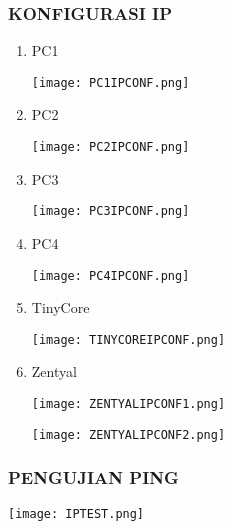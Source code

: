 \documentclass[12pt,a4paper]{article}
\begin{document}
\begin{center}
\subsubsection*{KONFIGURASI IP}
\begin{enumerate}

  \item PC1

    \texttt{[image: PC1IPCONF.png]}

  \item PC2

    \texttt{[image: PC2IPCONF.png]}

  \item PC3

    \texttt{[image: PC3IPCONF.png]}

  \item PC4

    \texttt{[image: PC4IPCONF.png]}

  \item TinyCore

    \texttt{[image: TINYCOREIPCONF.png]}

  \item Zentyal

    \texttt{[image: ZENTYALIPCONF1.png]}

    \texttt{[image: ZENTYALIPCONF2.png]}

\end{enumerate}
\end{center}


\begin{center}
\subsubsection*{PENGUJIAN PING}
	\texttt{[image: IPTEST.png]}
\end{center}
\end{document}
